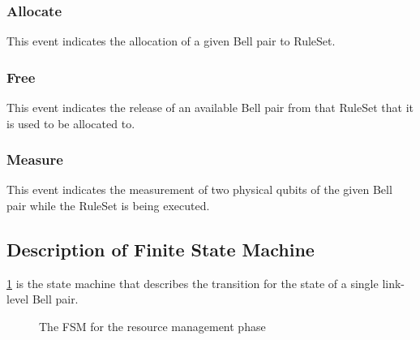 \subsubsection{Allocate}
This event indicates the allocation of a given Bell pair to RuleSet.

\subsubsection{Free}
This event indicates the release of an available Bell pair from that RuleSet that it is used to be allocated to.

\subsubsection{Measure}
This event indicates the measurement of two physical qubits of the given Bell pair while the RuleSet is being executed.

\subsection{Description of Finite State Machine}

\ref{fig:link_state_machine} is the state machine that describes the transition for the state of a single link-level Bell pair.

\begin{figure}[ht] %
  \centering %
  \caption{The FSM for the resource management phase}
  \label{fig:link_state_machine}
\end{figure}


